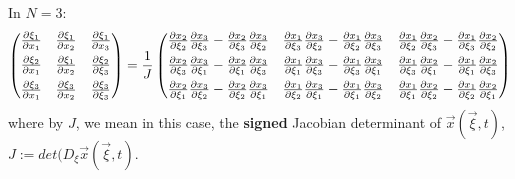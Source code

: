 \documentclass[11pt, a4paper]{article} %
\begin{document}
In $N=3$:
\begin{equation}
\begin{pmatrix}
\pdv{\xi_1}{x_1} & \pdv{\xi_1}{x_2} & \pdv{\xi_1}{x_3} \vspace{0.15cm}\\
\pdv{\xi_2}{x_1} & \pdv{\xi_1}{x_2} & \pdv{\xi_2}{\xi_3}\vspace{0.15cm}\\
\pdv{\xi_3}{x_1} & \pdv{\xi_3}{x_2} & \pdv{\xi_3}{\xi_3}
\end{pmatrix}= \frac{1}{J} \begin{pmatrix}
\pdv{x_2}{\xi_2}\pdv{x_3}{\xi_3}-\pdv{x_2}{\xi_3}\pdv{x_3}{\xi_2} & \pdv{x_1}{\xi_3}\pdv{x_3}{\xi_2}- \pdv{x_1}{\xi_2}\pdv{x_3}{\xi_3} & \pdv{x_1}{\xi_2}\pdv{x_2}{\xi_3}-\pdv{x_1}{\xi_3}\pdv{x_2}{\xi_2} \vspace{0.15cm}\\

\pdv{x_2}{\xi_3}\pdv{x_3}{\xi_1}-\pdv{x_2}{\xi_1}\pdv{x_3}{\xi_3} & \pdv{x_1}{\xi_1}\pdv{x_3}{\xi_3}- \pdv{x_1}{\xi_3}\pdv{x_3}{\xi_1} & \pdv{x_1}{\xi_3}\pdv{x_2}{\xi_1}-\pdv{x_1}{\xi_1}\pdv{x_2}{\xi_3} \vspace{0.15cm}\\

\pdv{x_2}{\xi_1}\pdv{x_3}{\xi_2}-\pdv{x_2}{\xi_2}\pdv{x_3}{\xi_1} & \pdv{x_1}{\xi_2}\pdv{x_3}{\xi_1}- \pdv{x_1}{\xi_1}\pdv{x_3}{\xi_2} & \pdv{x_1}{\xi_1}\pdv{x_2}{\xi_2}-\pdv{x_1}{\xi_2}\pdv{x_2}{\xi_1} \\

\end{pmatrix}
\end{equation}
where by $J$, we mean in this case, the {\bf signed} Jacobian determinant of $\vec{x}(\vec{\xi},t)$,  $J:=det(D_\xi\vec{x}(\vec{\xi},t)$.
\end{document}
